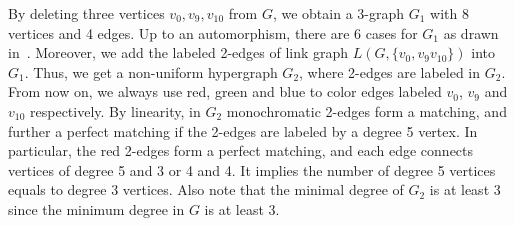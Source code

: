 \documentclass[a4paper]{article}
\begin{document}
By deleting three vertices $v_0,v_{9},v_{10}$ from $G$, we obtain a 3-graph $G_1$ with 8 vertices and 4 edges. Up to an automorphism, there are 6 cases for $G_1$ as drawn in~. Moreover, we add the labeled 2-edges of link graph $L(G,\{v_0,v_9v_{10}\})$ into $G_1$. Thus, we get a non-uniform hypergraph $G_2$, where 2-edges are labeled in $G_2$. From now on, we always use red, green and blue to color edges labeled $v_0$, $v_9$ and $v_{10}$ respectively. By linearity, in $G_2$ monochromatic 2-edges form a matching, and further a perfect matching if the 2-edges are labeled by a degree 5 vertex. In particular, the red 2-edges form a perfect matching, and each edge connects vertices of degree 5 and 3 or 4 and 4. It implies the number of degree 5 vertices equals to degree 3 vertices. Also note that the minimal degree of $G_2$ is at least 3 since the minimum degree in $G$ is at least 3. 
\end{document}
